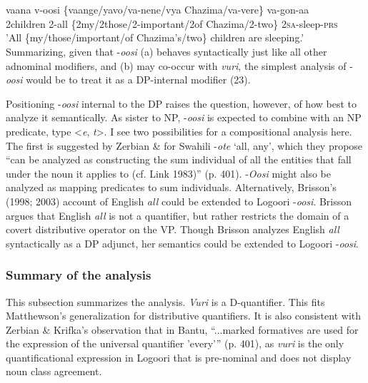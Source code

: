 \documentclass[output=paper]{langsci/langscibook}
\begin{document}
\chapter{}
\gll vaana  v-oosi\textup{   \{}vaange\textup{/}yavo\textup{/}va-nene/vya Chazima/va-vere\}  va-gon-aa\\
     2children  2-all   \{2my/2those/2-important/2of Chazima/2-two\}  2\textsc{sa}{}-sleep-\textsc{prs}\\
     'All \{my/those/important/of Chazima's/two\} children are sleeping.'  \\
  Summarizing, given that -\textit{oosi} (a) behaves syntactically just like all other adnominal modifiers, and (b) may co-occur with \textit{vuri}, the simplest analysis of -\textit{oosi }would be to treat it as a DP-internal modifier (23).

  Positioning -\textit{oosi} internal to the DP raises the question, however, of how best to analyze it semantically. As sister to NP, -\textit{oosi} is expected to combine with an NP predicate, type {\textless}\textit{e},\textit{ t}{\textgreater}. I see two possibilities for a compositional analysis here. The first is suggested by Zerbian \& \citet{Krifka2008} for Swahili -\textit{ote} ‘all, any’, which they propose “can be analyzed as constructing the sum individual of all the entities that fall under the noun it applies to (cf. Link 1983)” (p. 401). -\textit{Oosi} might also be analyzed as mapping predicates to sum individuals. Alternatively, Brisson’s (1998; 2003) account of English \textit{all} could be extended to Logoori -\textit{oosi}. Brisson argues that English \textit{all} is not a quantifier, but rather restricts the domain of a covert distributive operator on the VP. Though Brisson analyzes English \textit{all} syntactically as a DP adjunct, her semantics could be extended to Logoori -\textit{oosi}. 

\subsection{Summary of the analysis}

  This subsection summarizes the analysis. \textit{Vuri} is a D-quantifier. This fits Matthewson's generalization for distributive quantifiers. It is also consistent with Zerbian \& Krifka's observation that in Bantu, “...marked formatives are used for the expression of the universal quantifier 'every'” (p. 401), as \textit{vuri }is the only quantificational expression in Logoori that is pre-nominal and does not display noun class agreement. 
\end{document}
